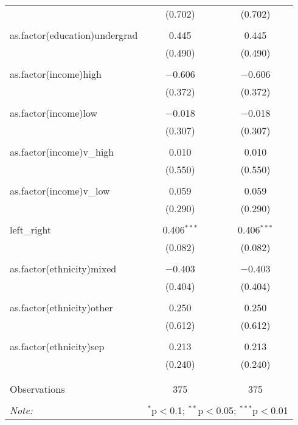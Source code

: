 \documentclass[12pt,letterpaper]{article}
\begin{document}
\begin{table}[p]
\begin{tabular}{@{\extracolsep{1pt}}lcc}
				& (0.702) & (0.702) \\ 
				& & \\ 
				as.factor(education)undergrad & 0.445 & 0.445 \\ 
				& (0.490) & (0.490) \\ 
				& & \\ 
				as.factor(income)high & $-$0.606 & $-$0.606 \\ 
				& (0.372) & (0.372) \\ 
				& & \\ 
				as.factor(income)low & $-$0.018 & $-$0.018 \\ 
				& (0.307) & (0.307) \\ 
				& & \\ 
				as.factor(income)v\_high & 0.010 & 0.010 \\ 
				& (0.550) & (0.550) \\ 
				& & \\ 
				as.factor(income)v\_low & 0.059 & 0.059 \\ 
				& (0.290) & (0.290) \\ 
				& & \\ 
				left\_right & 0.406$^{***}$ & 0.406$^{***}$ \\ 
				& (0.082) & (0.082) \\ 
				& & \\ 
				as.factor(ethnicity)mixed & $-$0.403 & $-$0.403 \\ 
				& (0.404) & (0.404) \\ 
				& & \\ 
				as.factor(ethnicity)other & 0.250 & 0.250 \\ 
				& (0.612) & (0.612) \\ 
				& & \\ 
				as.factor(ethnicity)sep & 0.213 & 0.213 \\ 
				& (0.240) & (0.240) \\ 
				& & \\ 
				\hline \\[-1.8ex] 
				Observations & 375 & 375 \\ 
				\hline 
				\hline \\[-1.8ex] 
				\textit{Note:}  & \multicolumn{2}{r}{$^{*}$p$<$0.1; $^{**}$p$<$0.05; $^{***}$p$<$0.01} \\ 
			\end{tabular} 
		\end{table} 
		
	
		
		
		\newpage
		
\end{document}

